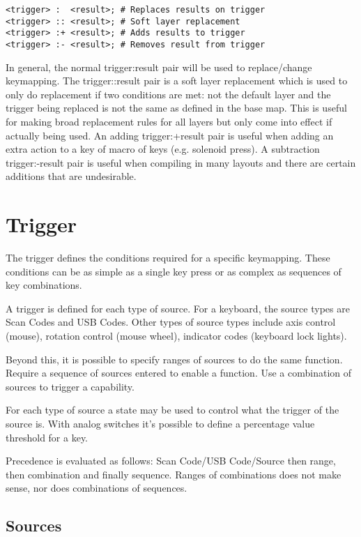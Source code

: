 \documentclass{kiibohd-template}
\begin{document}
\begin{lstlisting}
<trigger> :  <result>; # Replaces results on trigger
<trigger> :: <result>; # Soft layer replacement
<trigger> :+ <result>; # Adds results to trigger
<trigger> :- <result>; # Removes result from trigger
\end{lstlisting}

In general, the normal trigger:result pair will be used to replace/change keymapping.
The trigger::result pair is a soft layer replacement which is used to only do replacement if two conditions are met: not the default layer and the trigger being replaced is not the same as defined in the base map.
This is useful for making broad replacement rules for all layers but only come into effect if actually being used.
An adding trigger:+result pair is useful when adding an extra action to a key of macro of keys (e.g. solenoid press).
A subtraction trigger:-result pair is useful when compiling in many layouts and there are certain additions that are undesirable.


\section{Trigger}

The trigger defines the conditions required for a specific keymapping.
These conditions can be as simple as a single key press or as complex as sequences of key combinations.

A trigger is defined for each type of source.
For a keyboard, the source types are Scan Codes and USB Codes.
Other types of source types include axis control (mouse), rotation control (mouse wheel), indicator codes (keyboard lock lights).

Beyond this, it is possible to specify ranges of sources to do the same function.
Require a sequence of sources entered to enable a function.
Use a combination of sources to trigger a capability.

For each type of source a state may be used to control what the trigger of the source is.
With analog switches it's possible to define a percentage value threshold for a key.

Precedence is evaluated as follows: Scan Code/USB Code/Source then range, then combination and finally sequence.
Ranges of combinations does not make sense, nor does combinations of sequences.


\subsection{Sources}
\end{document}
